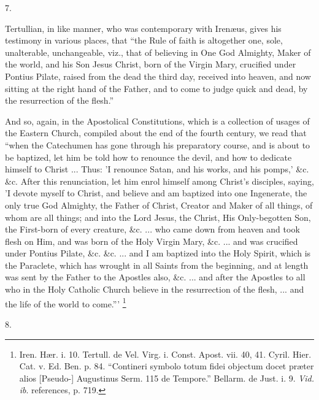 7.

Tertullian, in like manner, who was contemporary with Irenæus,
gives his testimony in various places, that ``the Rule of faith is
altogether one, sole, unalterable, unchangeable, viz., that of
believing in One God Almighty, Maker of the world, and his Son
Jesus Christ, born of the Virgin Mary, crucified under Pontius Pilate,
raised from the dead the third day, received into heaven, and now
sitting at the right hand of the Father, and to come to judge quick
and dead, by the resurrection of the flesh.''

And so, again, in the Apostolical Constitutions, which is a
collection of usages of the Eastern Church, compiled about the end of
the fourth century, we read that ``when the Catechumen has gone
through his preparatory course, and is about to be baptized, let him
be told how to renounce the devil, and how to dedicate himself to
Christ ... Thus: 'I renounce Satan, and his works, and his pomps,'
\&c. \&c. After this renunciation, let him enrol himself among
Christ's disciples, saying, 'I devote myself to Christ, and believe
and am baptized into one Ingenerate, the only true God Almighty, the
Father of Christ, Creator and Maker of all things, of whom are all
things; and into the Lord Jesus, the Christ, His Only-begotten Son,
the First-born of every creature, \&c. ... who came down from
heaven and took flesh on Him, and was born of the Holy Virgin Mary,
\&c. ... and was crucified under Pontius Pilate, \&c. \&c.
... and I am baptized into the Holy Spirit, which is the Paraclete,
which has wrought in all Saints from the beginning, and at length was
sent by the Father to the Apostles also, \&c. ... and after the
Apostles to all who in the Holy Catholic Church believe in the
resurrection of the flesh, ... and the life of the world to
come.''' \footnote{Iren. Hær. i. 10. Tertull. de Vel. Virg. i.
Const. Apost. vii. 40, 41. Cyril. Hier. Cat. v. Ed. Ben. p. 84. ``Contineri
symbolo totum fidei objectum docet præter alios [Pseudo-] Augustinus
Serm. 115 de Tempore.'' Bellarm. de Just. i. 9. \emph{Vid. ib}.
references, p. 719.}

8.

